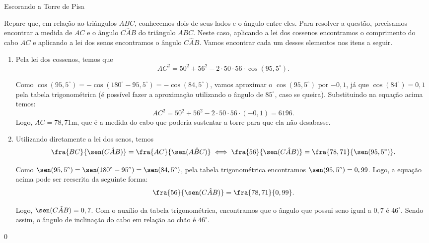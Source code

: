 \begin{answer}{Escorando a Torre de Pisa}
{
Repare que, em relação ao triângulos $ABC$, conhecemos dois de seus lados e o ângulo entre eles. Para resolver a questão, precisamos encontrar a medida de $AC$ e o ângulo $C\hat{A}B$ do triângulo $ABC$. Neste caso,  aplicando a lei dos cossenos encontramos o comprimento do cabo $AC$ e aplicando a lei dos senos encontramos o ângulo $C\hat{A}B$. Vamos encontrar cada um desses elementos nos itens a seguir.

\begin{enumerate}
    \item{}
    Pela lei dos cossenos, temos que 
    $$AC^2=50^2+56^2-2\cdot50\cdot56\cdot\cos(95,5^\circ).$$
    
    Como $\cos(95,5^\circ)=-\cos(180^\circ-95,5^\circ)=-\cos(84,5^\circ)$, vamos aproximar o $\cos(95,5^\circ)$ por $-0,1$, já que $\cos(84^\circ)=0,1$ pela tabela trigonométrica (é possível fazer a aproximação utilizando o ângulo de $85^\circ$, caso se queira). Substituindo na equação acima temos:
    $$AC^2=50^2+56^2-2\cdot50\cdot56\cdot(-0,1)=6196.$$
    Logo, $AC=78,71$m, que é a medida do cabo que poderia sustentar a torre para que ela não desabasse.
 
    \item{} 
    Utilizando diretamente a lei dos senos, temos
    $$\fra{BC}{\sen(C\hat{A}B)}=\fra{AC}{\sen(A\hat{B}C)} \iff \fra{56}{\sen (C\hat{A}B)}=\fra{78,71}{\sen(95,5^\circ)}.$$
    
    Como $\sen(95,5^\circ)=\sen(180^\circ-95^\circ)=\sen(84,5^\circ)$, pela tabela trigonométrica encontramos $\sen(95,5^\circ)=0,99$. Logo, a equação acima pode ser reescrita da seguinte forma:
    $$\fra{56}{\sen(C\hat{A}B)}=\fra{78,71}{0,99}.$$
    
    Logo, $\sen(C\hat{A}B)=0,7$. Com o auxílio da tabela trigonométrica, encontramos que o ângulo que possui seno igual a $0,7$ é $46^\circ$. Sendo assim, o ângulo de inclinação do cabo em relação ao chão é $46^\circ$.
\end{enumerate}
}{0}
\end{answer}
\def\currentcolor{session4}

